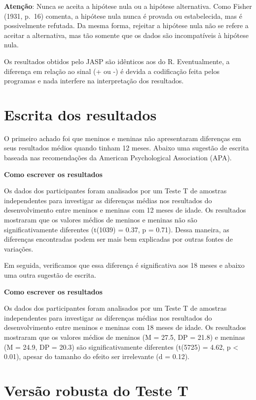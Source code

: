 \documentclass[
]{book}
\begin{document}
\textbf{Atenção}: Nunca se aceita a hipótese nula ou a hipótese alternativa. Como Fisher (1931, p.~16) comenta, a hipótese nula nunca é provada ou estabelecida, mas é possivelmente refutada. Da mesma forma, rejeitar a hipótese nula não se refere a aceitar a alternativa, mas tão somente que os dados são incompatíveis à hipótese nula.

Os resultados obtidos pelo JASP são idênticos aos do R. Eventualmente, a diferença em relação ao sinal (+ ou -) é devida a codificação feita pelos programas e nada interfere na interpretação dos resultados.

\hypertarget{escrita-dos-resultados-2}{%
\section{Escrita dos resultados}\label{escrita-dos-resultados-2}}

O primeiro achado foi que meninos e meninas não apresentaram diferenças em seus resultados médios quando tinham 12 meses. Abaixo uma sugestão de escrita baseada nas recomendações da American Psychological Association (APA).

\textbf{Como escrever os resultados}

Os dados dos participantes foram analisados por um Teste T de amostras independentes para investigar as diferenças médias nos resultados do desenvolvimento entre meninos e meninas com 12 meses de idade. Os resultados mostraram que os valores médios de meninos e meninas não são significativamente diferentes (t(1039) = 0.37, p = 0.71). Dessa maneira, as diferenças encontradas podem ser mais bem explicadas por outras fontes de variações.

Em seguida, verificamos que essa diferença é significativa aos 18 meses e abaixo uma outra sugestão de escrita.

\textbf{Como escrever os resultados}

Os dados dos participantes foram analisados por um Teste T de amostras independentes para investigar as diferenças médias nos resultados do desenvolvimento entre meninos e meninas com 18 meses de idade. Os resultados mostraram que os valores médios de meninos (M = 27.5, DP = 21.8) e meninas (M = 24.9, DP = 20.3) são significativamente diferentes (t(5725) = 4.62, p \textless{} 0.01), apesar do tamanho do efeito ser irrelevante (d = 0.12).

\hypertarget{versuxe3o-robusta-do-teste-t}{%
\section{Versão robusta do Teste T}\label{versuxe3o-robusta-do-teste-t}}
\end{document}
